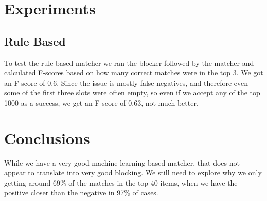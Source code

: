 \documentclass{vldb}
\begin{document}
\section{Experiments}
\subsection{Rule Based}
To test the rule based matcher we ran the blocker followed by the matcher and calculated F-scores based on how many correct matches were in the top 3. We got an F-score of 0.6. Since the issue is mostly false negatives, and therefore even some of the first three slots were often empty, so even if we accept any of the top 1000 as a success, we get an F-score of 0.63, not much better.

\section{Conclusions}
While we have a very good machine learning based matcher, that does not appear to translate into very good blocking. We still need to explore why we only getting around 69\% of the matches in the top 40 items, when we have the positive closer than the negative in 97\% of cases.  

\balance





\end{document}
